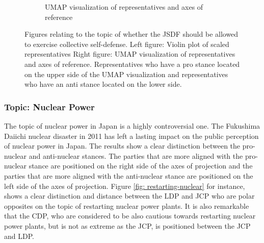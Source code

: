 \documentclass[final,5p,times,twocolumn,authoryear]{elsarticle}
\begin{document}
\begin{figure}[h]
\begin{subfigure}{0.22\textwidth}
      \caption{UMAP visualization of representatives and axes of reference}
    \end{subfigure}
\caption{Figures relating to the topic of whether the JSDF should be allowed to exercise collective self-defense.
Left figure: Violin plot of scaled representatives
Right figure: UMAP visualization of representatives and axes of reference. Representatives who have a pro stance located on the upper side of the UMAP visualization and representatives who have an anti stance located on the lower side.}
\label{fig: results-defence-collective}
\end{figure}

\FloatBarrier
\subsubsection{Topic: Nuclear Power}

The topic of nuclear power in Japan is a highly controversial one. The Fukushima Daiichi nuclear disaster in 2011 has left a lasting impact on the public perception of nuclear power in Japan. The results show a clear distinction between the pro-nuclear and anti-nuclear stances. The parties that are more aligned with the pro-nuclear stance are positioned on the right side of the axes of projection and the parties that are more aligned with the anti-nuclear stance are positioned on the left side of the axes of projection. Figure \ref{fig: restarting-nuclear} for instance, shows a clear distinction and distance between the LDP and JCP who are polar opposites on the topic of restarting nuclear power plants. It is also remarkable that the CDP, who are considered to be also cautious towards restarting nuclear power plants, but is not as extreme as the JCP, is positioned between the JCP and LDP.
\end{document}

